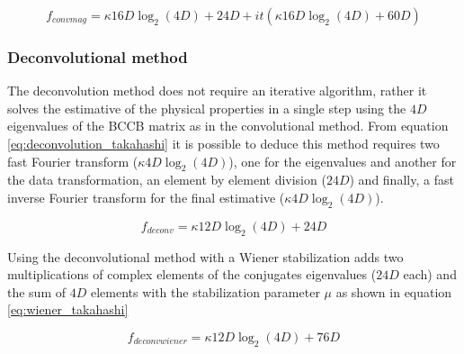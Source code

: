 \begin{equation}
	f_{convmag} = \kappa16D\log_2(4D) + 24D + it(\kappa16D\log_2(4D) + 60D)
\label{convmag}
\end{equation}

\subsubsection{Deconvolutional method}

The deconvolution method does not require an iterative algorithm, rather it solves the estimative of the physical properties in a single step using the $4D$ eigenvalues of the BCCB matrix as in the convolutional method. From equation \ref{eq:deconvolution_takahashi} it is possible to deduce this method requires two fast Fourier transform ($\kappa4D\log_2(4D)$), one for the eigenvalues and another for the data transformation, an element by element division ($24D$) and finally, a fast inverse Fourier transform for the final estimative ($\kappa4D\log_2(4D)$).

\begin{equation}
	f_{deconv} = \kappa12D\log_2(4D) + 24D
	\label{deconv}
\end{equation}

Using the deconvolutional method with a Wiener stabilization adds two multiplications of complex elements of the conjugates eigenvalues ($24D$ each) and the sum of $4D$ elements with the stabilization parameter $\mu$ as shown in equation \ref{eq:wiener_takahashi}

\begin{equation}
	f_{deconvwiener} = \kappa12D\log_2(4D) + 76D
	\label{deconvwiener}
\end{equation}
